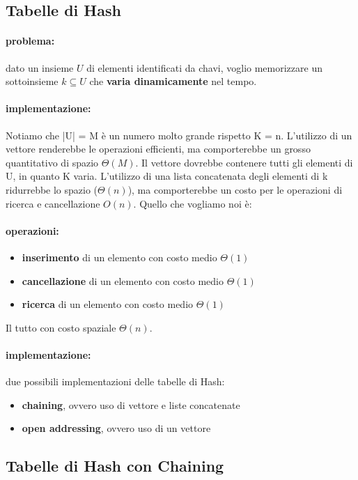 \documentclass{article}
\begin{document}
\subsection{Tabelle di Hash} %
\paragraph{problema:} dato un insieme $U$ di elementi identificati da chavi, voglio memorizzare un sottoinsieme $k \subseteq U$ che \textbf{varia dinamicamente} nel tempo.
\paragraph{implementazione:}Notiamo che |U| = M è un numero molto grande rispetto K = n. L'utilizzo di un vettore renderebbe le operazioni efficienti, ma comporterebbe un grosso quantitativo di spazio $\Theta(M)$. Il vettore dovrebbe 
contenere tutti gli elementi di U, in quanto K varia. L'utilizzo 
di una lista concatenata degli elementi di k ridurrebbe lo spazio ($\Theta(n)$), ma comporterebbe un costo per le operazioni di ricerca e cancellazione $O(n)$. Quello che vogliamo noi è:
\paragraph{operazioni:}
\begin{itemize}
    \item \textbf{inserimento} di un elemento con costo medio $\Theta(1)$
    \item \textbf{cancellazione} di un elemento con costo medio $\Theta(1)$
    \item \textbf{ricerca} di un elemento con costo medio $\Theta(1)$
\end{itemize}
Il tutto con costo spaziale $\Theta(n)$.

\paragraph{implementazione:} due possibili implementazioni delle tabelle di Hash:
\begin{itemize}
    \item \textbf{chaining}, ovvero uso di vettore e liste concatenate
    \item \textbf{open addressing}, ovvero uso di un vettore
\end{itemize}

\subsection{Tabelle di Hash con Chaining} %
\end{document}

